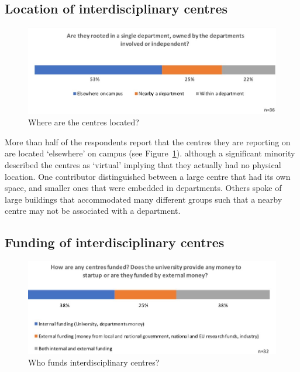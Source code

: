 \subsection{ Location of interdisciplinary centres}

\begin{figure}[h]
\centering
\includegraphics[width = \linewidth]{charts/5d.jpg}
\caption{ Where are the centres located?}
\label{sect5:locations}
\end{figure}

More than half of the respondents report that the centres they are reporting on are located `elsewhere' on campus (see Figure~\ref{sect5:locations}). although a significant minority described the centres as `virtual' implying that they actually had no physical location. One contributor distinguished between a large centre that had its own space, and smaller ones that were embedded in departments. Others spoke of large buildings that accommodated many different groups such that a nearby centre may not be associated with a department.

\subsection{Funding of interdisciplinary centres}

\begin{figure}[h]
\centering
\includegraphics[width = \linewidth]{charts/5e.jpg}
\caption{Who funds interdisciplinary centres?}
\label{sect5:funding}
\end{figure}

